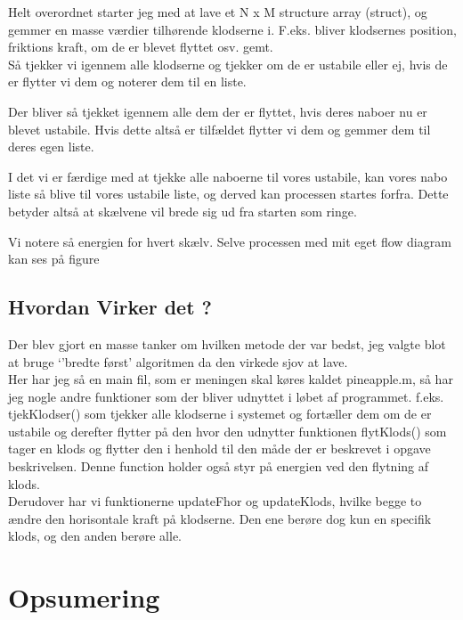 \documentclass[11pt]{article}
\begin{document}
Helt overordnet starter jeg med at lave et N x M structure array (struct), og gemmer en masse værdier tilhørende klodserne i. F.eks. bliver klodsernes position, friktions kraft, om de er blevet flyttet osv. gemt. \\

Så tjekker vi igennem alle klodserne og tjekker om de er ustabile eller ej, hvis de er flytter vi dem og noterer dem til en liste.

Der bliver så tjekket igennem alle dem der er flyttet, hvis deres naboer nu er blevet ustabile. Hvis dette altså er tilfældet flytter vi dem og gemmer dem til deres egen liste. 

I det vi er færdige med at tjekke alle naboerne til vores ustabile, kan vores nabo liste så blive til vores ustabile liste, og derved kan processen startes forfra. Dette betyder altså at skælvene vil brede sig ud fra starten som ringe. 

Vi notere så energien for hvert skælv. Selve processen med mit eget flow diagram kan ses på figure 
\subsection{Hvordan Virker det ? } %
\label{sub:hvordan_virker_det_}
Der blev gjort en masse tanker om hvilken metode der var bedst, jeg valgte blot at bruge 
`'bredte først' algoritmen da den virkede sjov at lave. \\
Her har jeg så en main fil, som er meningen skal køres kaldet pineapple.m, så har jeg nogle andre funktioner som der bliver udnyttet i løbet af programmet. f.eks. tjekKlodser() som tjekker alle klodserne i systemet og fortæller dem om de er ustabile og derefter flytter på den hvor den udnytter funktionen  flytKlods() som tager en klods og flytter den i henhold til den måde der er beskrevet i opgave beskrivelsen. Denne function holder også styr på energien ved den flytning af klods. \\
Derudover har vi funktionerne updateFhor og updateKlods, hvilke begge to ændre den horisontale kraft på klodserne. Den ene berøre dog kun en specifik klods, og den anden berøre alle.





\section{Opsumering} %
\label{sec:}
\end{document}
